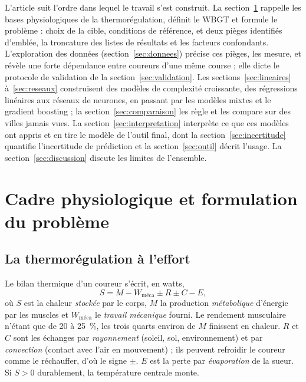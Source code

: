 \documentclass[11pt,a4paper]{article}
\begin{document}
L'article suit l'ordre dans lequel le travail s'est construit. La section~\ref{sec:cadre} rappelle les bases
physiologiques de la thermorégulation, définit le WBGT et formule le problème : choix de la cible, conditions de
référence, et deux pièges identifiés d'emblée, la troncature des listes de résultats et les facteurs confondants.
L'exploration des données (section~\ref{sec:donnees}) précise ces pièges, les mesure, et révèle une forte dépendance
entre coureurs d'une même course ; elle dicte le protocole de validation de la section~\ref{sec:validation}. Les
sections~\ref{sec:lineaires} à~\ref{sec:reseaux} construisent des modèles de complexité croissante, des régressions
linéaires aux réseaux de neurones, en passant par les modèles mixtes et le gradient boosting ; la
section~\ref{sec:comparaison} les règle et les compare sur des villes jamais vues. La section~\ref{sec:interpretation}
interprète ce que ces modèles ont appris et en tire le modèle de l'outil final, dont la section~\ref{sec:incertitude}
quantifie l'incertitude de prédiction et la section~\ref{sec:outil} décrit l'usage. La section~\ref{sec:discussion}
discute les limites de l'ensemble.

\section{Cadre physiologique et formulation du problème}\label{sec:cadre}

\subsection{La thermorégulation à l'effort}\label{sec:physio}

Le bilan thermique d'un coureur s'écrit, en watts,
\[
S = M - W_{\text{méca}} \pm R \pm C - E,
\]
où $S$ est la chaleur \emph{stockée} par le corps, $M$ la production \emph{métabolique} d'énergie par les muscles et
$W_{\text{méca}}$ le \emph{travail mécanique} fourni. Le rendement musculaire n'étant que de 20 à 25~\%, les trois
quarts environ de $M$ finissent en chaleur. $R$ et $C$ sont les échanges par \emph{rayonnement} (soleil, sol,
environnement) et par \emph{convection} (contact avec l'air en mouvement) ; ils peuvent refroidir le coureur comme le
réchauffer, d'où le signe $\pm$. $E$ est la perte par \emph{évaporation} de la sueur. Si $S > 0$ durablement, la
température centrale monte.
\end{document}
